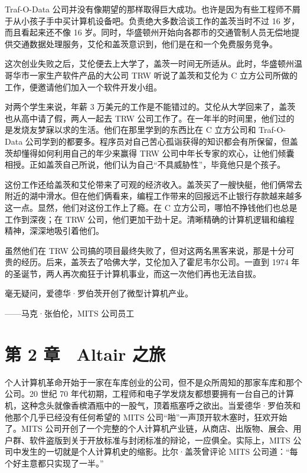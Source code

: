 \documentclass[12pt,UTF8]{ctexbook}
\begin{document}
Traf-O-Data 公司并没有像期望的那样取得巨大成功。也许是因为有些工程师不屑于从小孩子手中买计算机设备吧。负责绝大多数洽谈工作的盖茨当时不过 16 岁，而且看起来还不像 16 岁。同时，华盛顿州开始向各郡市的交通管制人员无偿地提供交通数据处理服务，艾伦和盖茨意识到，他们是在和一个免费服务竞争。

这次创业失败之后，艾伦便去上大学了，盖茨一时间无所适从。此时，华盛顿州温哥华市一家生产软件产品的大公司 TRW 听说了盖茨和艾伦为 C 立方公司所做的工作，便邀请他们加入一个软件开发小组。

对两个学生来说，年薪 3 万美元的工作是不能错过的。艾伦从大学回来了，盖茨也从高中请了假，两人一起去 TRW 公司工作了。在一年半的时间里，他们过的是发烧友梦寐以求的生活。他们在那里学到的东西比在 C 立方公司和 Traf-O-Data 公司学到的都要多。程序员对自己苦心孤诣获得的知识都会有所保留，但盖茨却懂得如何利用自己的年少来赢得 TRW 公司中年长专家的欢心，让他们倾囊相授。正如盖茨自己所说，他们认为自己“不具威胁性”，毕竟他只是个孩子。

这份工作还给盖茨和艾伦带来了可观的经济收入。盖茨买了一艘快艇，他们俩常去附近的湖中滑水。但在他们俩看来，编程工作带来的回报远不止银行存款越来越多这一点。显然，他们对这份工作上了瘾。在 C 立方公司，哪怕不挣钱他们也总是工作到深夜；在 TRW 公司，他们更加干劲十足。清晰精确的计算机逻辑和编程精神，深深地吸引着他们。

虽然他们在 TRW 公司搞的项目最终失败了，但对这两名黑客来说，那是十分可贵的经历。后来，盖茨去了哈佛大学，艾伦加入了霍尼韦尔公司。一直到 1974 年的圣诞节，两人再次痴狂于计算机事业，而这一次他们再也无法自拔。





毫无疑问，爱德华·罗伯茨开创了微型计算机产业。

——马克·张伯伦，MITS 公司员工





\chapter{第 2 章　Altair 之旅}


个人计算机革命开始于一家在车库创业的公司，但不是众所周知的那家车库和那个公司。20 世纪 70 年代初期，工程师和电子学发烧友都想要拥有一台自己的计算机，这种念头就像香槟酒瓶中的一股气，顶着瓶塞呼之欲出。当爱德华·罗伯茨和他那个几乎已经没有任何希望的 MITS 公司“啪”一声顶开软木塞时，狂欢开始了。MITS 公司开创了一个完整的个人计算机产业链，从商店、出版物、展会、用户群、软件盗版到关于开放标准与封闭标准的辩论，一应俱全。实际上，MITS 公司中发生的一切就是个人计算机史的缩影。比尔·盖茨曾评论 MITS 公司道：“每个好主意都只实现了一半。”
\end{document}
